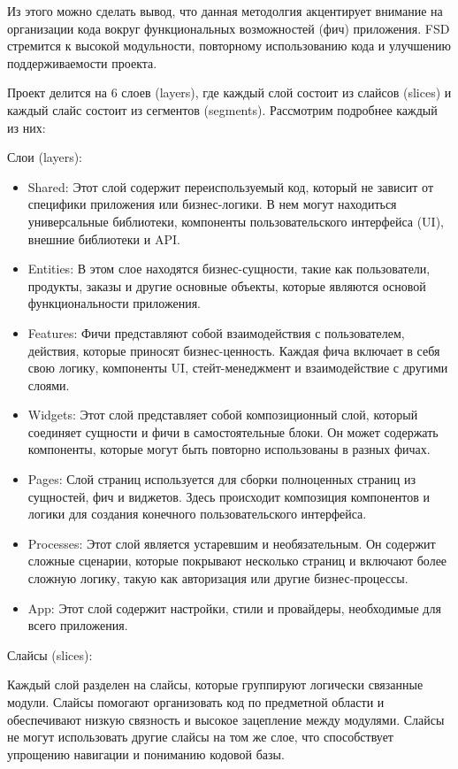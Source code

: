 Из этого можно сделать вывод, что данная методолгия акцентирует внимание на организации кода вокруг функциональных возможностей (фич) приложения. FSD стремится к высокой модульности, повторному использованию кода и улучшению поддерживаемости проекта.

Проект делится на 6 слоев (layers), где каждый слой состоит из слайсов (slices) и каждый слайс состоит из сегментов (segments). Рассмотрим подробнее каждый из них:

Слои (layers):

\begin{itemize}
    \item Shared: Этот слой содержит переиспользуемый код, который не зависит от специфики приложения или бизнес-логики. В нем могут находиться универсальные библиотеки, компоненты пользовательского интерфейса (UI), внешние библиотеки и API.
    \item Entities: В этом слое находятся бизнес-сущности, такие как пользователи, продукты, заказы и другие основные объекты, которые являются основой функциональности приложения.
    \item Features: Фичи представляют собой взаимодействия с пользователем, действия, которые приносят бизнес-ценность. Каждая фича включает в себя свою логику, компоненты UI, стейт-менеджмент и взаимодействие с другими слоями.
    \item Widgets: Этот слой представляет собой композиционный слой, который соединяет сущности и фичи в самостоятельные блоки. Он может содержать компоненты, которые могут быть повторно использованы в разных фичах.
    \item Pages: Слой страниц используется для сборки полноценных страниц из сущностей, фич и виджетов. Здесь происходит композиция компонентов и логики для создания конечного пользовательского интерфейса.
    \item Processes: Этот слой является устаревшим и необязательным. Он содержит сложные сценарии, которые покрывают несколько страниц и включают более сложную логику, такую как авторизация или другие бизнес-процессы.
    \item App: Этот слой содержит настройки, стили и провайдеры, необходимые для всего приложения.
\end{itemize}


Слайсы (slices):

Каждый слой разделен на слайсы, которые группируют логически связанные модули. Слайсы помогают организовать код по предметной области и обеспечивают низкую связность и высокое зацепление между модулями. Слайсы не могут использовать другие слайсы на том же слое, что способствует упрощению навигации и пониманию кодовой базы.

